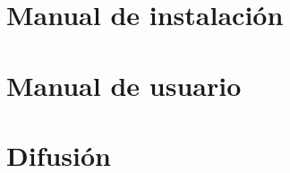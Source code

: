 \documentclass[a4paper,11pt,spanish]{book}
\begin{document}

\appendix

\chapter{Manual de instalación}


\chapter{Manual de usuario}


\chapter{Difusión}


%

%

\clearpage
{}




\end{document}
